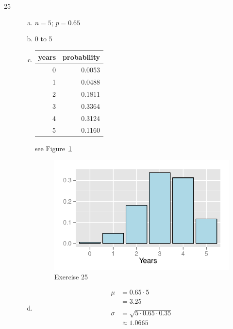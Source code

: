 \documentclass[letterpaper, landscape]{exam}
\begin{document}
\begin{description}
      \item[25]
        \begin{enumerate}[(a)]
          \item $n = 5$; $p = 0.65$

          \item 0 to 5

          \item 
            \begin{table}[ht]
              \centering
              \begin{tabular}{rr}
                \toprule
                years & probability \\
                \midrule
                0     & 0.0053 \\
                1     & 0.0488 \\
                2     & 0.1811 \\
                3     & 0.3364 \\
                4     & 0.3124 \\
                5     & 0.1160 \\
                \bottomrule
              \end{tabular}
            \end{table}

            see Figure~\ref{fig:ex25}

            \begin{figure}[H]
              \centering
              \includegraphics{ex25.pdf}
              \caption{Exercise 25}\label{fig:ex25}
            \end{figure}

          \item 
            \begin{align*}
              \mu    & = 0.65 \cdot 5 \\
                     & = \boxed{ 3.25 } \\
              \\
              \sigma & = \sqrt{5 \cdot 0.65 \cdot 0.35} \\
                     & \approx \boxed{ 1.0665 } \\
            \end{align*}
        \end{enumerate}


\end{description}
\end{document}

